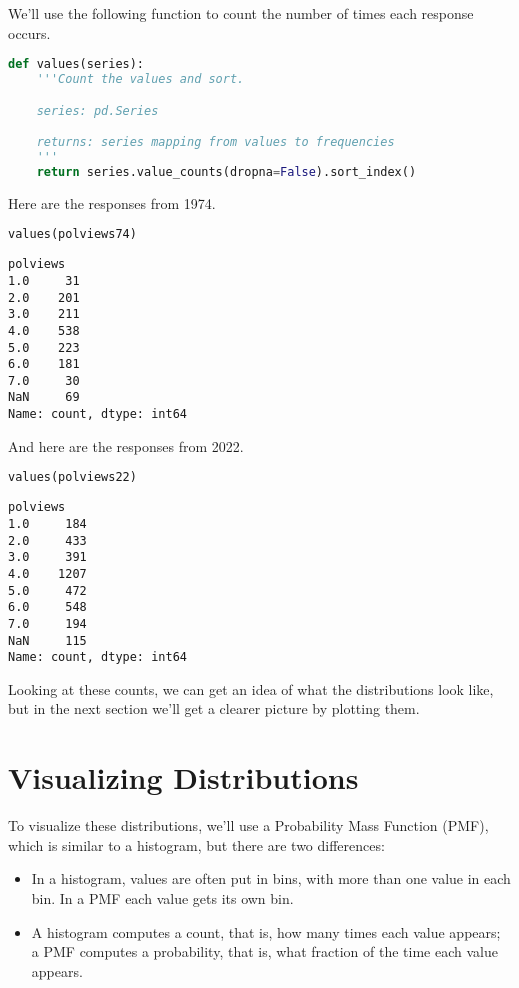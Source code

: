 \pagebreak

We'll use the following function to count the number of times each
response occurs.

\begin{lstlisting}[language=Python,style=source]
def values(series):
    '''Count the values and sort.

    series: pd.Series

    returns: series mapping from values to frequencies
    '''
    return series.value_counts(dropna=False).sort_index()
\end{lstlisting}

Here are the responses from 1974.

\begin{lstlisting}[language=Python,style=source]
values(polviews74)
\end{lstlisting}

\begin{lstlisting}[style=output]
polviews
1.0     31
2.0    201
3.0    211
4.0    538
5.0    223
6.0    181
7.0     30
NaN     69
Name: count, dtype: int64
\end{lstlisting}

And here are the responses from 2022.

\begin{lstlisting}[language=Python,style=source]
values(polviews22)
\end{lstlisting}

\begin{lstlisting}[style=output]
polviews
1.0     184
2.0     433
3.0     391
4.0    1207
5.0     472
6.0     548
7.0     194
NaN     115
Name: count, dtype: int64
\end{lstlisting}

Looking at these counts, we can get an idea of what the distributions
look like, but in the next section we'll get a clearer picture by
plotting them.

\section{Visualizing Distributions}\label{visualizing-distributions}

To visualize these distributions, we'll use a Probability Mass Function
(PMF), which is similar to a histogram, but there are two differences:

\begin{itemize}
\item
  In a histogram, values are often put in bins, with more than one value
  in each bin. In a PMF each value gets its own bin.
\item
  A histogram computes a count, that is, how many times each value
  appears; a PMF computes a probability, that is, what fraction of the
  time each value appears.
\end{itemize}

